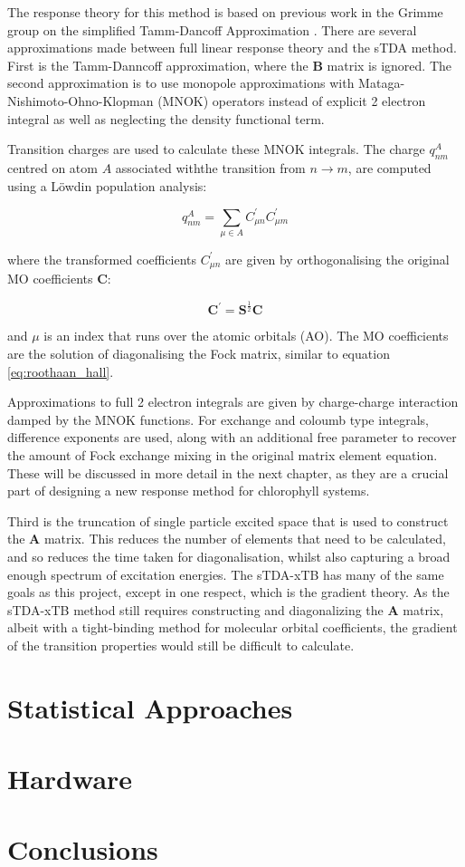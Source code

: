 The response theory for this method is based on previous work in the Grimme 
group on the simplified Tamm-Dancoff Approximation \cite{Grimme2013}.
There are several approximations made between full linear response theory and
the sTDA method. First is the Tamm-Danncoff approximation, where the $\mathbf{B}$
matrix is ignored. The second approximation is to use monopole approximations with
Mataga-Nishimoto-Ohno-Klopman (MNOK) operators instead of explicit 2 electron integral
as well as neglecting the density functional term.

Transition charges are used to calculate these MNOK integrals. The charge $q^A_{nm}$
centred on atom $A$ associated withthe transition from $ n \rightarrow m$, are
computed using a Löwdin population analysis:

\begin{equation}
q_{nm}^A = \sum_{\mu \in A} C^\prime_{\mu n} C^\prime_{\mu m}
\end{equation}

where the transformed coefficients $C^\prime_{\mu n}$ are given by orthogonalising
the original MO coefficients $\textbf{C}$:

\begin{equation}
\textbf{C}^\prime = \textbf{S}^{\frac{1}{2}} \textbf{C}
\end{equation}

and $\mu$ is an index that runs over the atomic orbitals (AO). The MO coefficients
are the solution of diagonalising the Fock matrix, similar to equation \ref{eq:roothaan_hall}.

Approximations to full 2 electron integrals are given by charge-charge interaction
damped by the MNOK\cite{Nishimoto1957}\cite{Ohno1964}\cite{Klopman1964} functions.
For exchange and coloumb type integrals, difference exponents are used, along with
an additional free parameter to recover the amount of Fock exchange mixing in
the original matrix element equation. These will be discussed in more detail in
the next chapter, as they are a crucial part of designing a new response method 
for chlorophyll systems.

Third is the truncation of single particle excited space that is used to construct 
the $\mathbf{A}$ matrix. This reduces the number of elements that need to be 
calculated, and so reduces the time taken for diagonalisation, whilst also capturing 
a broad enough spectrum of excitation energies. The sTDA-xTB has many of the same 
goals as this project, except in one respect, which is the gradient theory. As 
the sTDA-xTB method still requires constructing and diagonalizing the $\mathbf{A}$ 
matrix, albeit with a tight-binding method for molecular orbital coefficients, 
the gradient of the transition properties would still be difficult to calculate.

\section{Statistical Approaches}
\label{sec:stats_models}



\section{Hardware}
\label{}

\section{Conclusions}
\label{sec:lit_review_conclusions}
